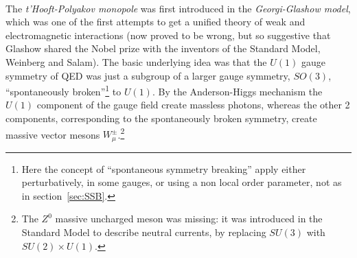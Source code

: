 \documentclass[../main/main.tex]{subfiles}
\begin{document}
\cite[Chapter 4]{Shifman:2012}\\

The \emph{t'Hooft-Polyakov monopole} was first introduced in the \emph{Georgi-Glashow model}, which was one of the first attempts to get a unified theory of weak and electromagnetic interactions (now proved to be wrong, but so suggestive that Glashow shared the Nobel prize with the inventors of the Standard Model, Weinberg and Salam). The basic underlying idea was that the $U(1)$ gauge symmetry of QED was just a subgroup of a larger gauge symmetry, $SO(3)$, ``spontaneously broken''\footnote{Here the concept of ``spontaneous symmetry breaking'' apply either perturbatively, in some gauges, or using a non local order parameter, not as in section~\ref{sec:SSB}.} to $U(1)$. By the Anderson-Higgs mechanism the $U(1)$ component of the gauge field create massless photons, whereas the other 2 components, corresponding to the spontaneously broken symmetry, create massive vector mesons $W_\mu^\pm$.\footnote{The $Z^0$ massive uncharged meson was missing: it was introduced in the Standard Model to describe neutral currents, by replacing $SU(3)$ with $SU(2)\times U(1)$.} 


\skipline
\end{document}
